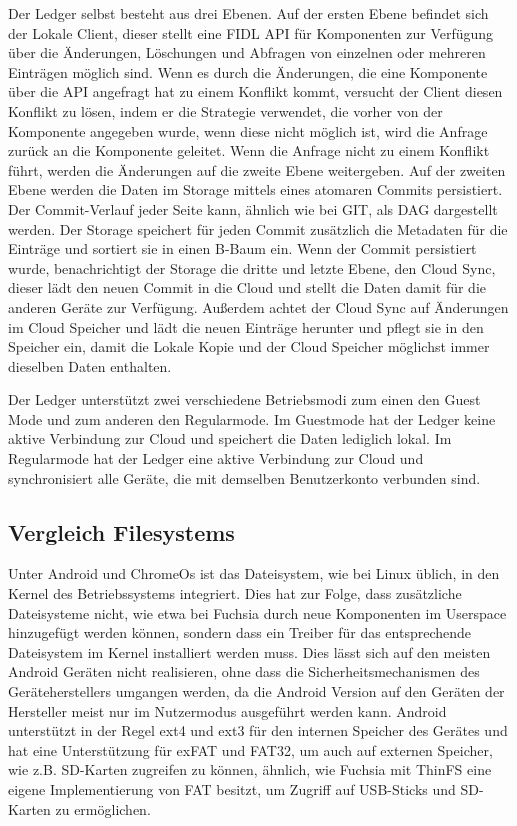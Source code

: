 \documentclass[a4paper]{scrartcl}
\begin{document}
Der Ledger selbst besteht aus drei Ebenen. Auf der ersten Ebene befindet sich der Lokale Client, dieser stellt eine FIDL API für Komponenten zur Verfügung über die Änderungen, Löschungen und Abfragen von einzelnen oder mehreren Einträgen möglich sind. Wenn es durch die Änderungen, die eine Komponente über die API angefragt hat zu einem Konflikt kommt, versucht der Client diesen Konflikt zu lösen, indem er die Strategie verwendet, die vorher von der Komponente angegeben wurde, wenn diese nicht möglich ist, wird die Anfrage zurück an die Komponente geleitet. Wenn die Anfrage nicht zu einem Konflikt führt, werden die Änderungen auf die zweite Ebene weitergeben. Auf der zweiten Ebene werden die Daten im Storage mittels eines atomaren Commits persistiert. Der Commit-Verlauf jeder Seite kann, ähnlich wie bei GIT, als DAG dargestellt werden. Der Storage speichert für jeden Commit zusätzlich die Metadaten für die Einträge und sortiert sie in einen B-Baum ein. Wenn der Commit persistiert wurde, benachrichtigt der Storage die dritte und letzte Ebene, den Cloud Sync, dieser lädt den neuen Commit in die Cloud und stellt die Daten damit für die anderen Geräte zur Verfügung. Außerdem achtet der Cloud Sync auf Änderungen im Cloud Speicher und lädt die neuen Einträge herunter und pflegt sie in den Speicher ein, damit die Lokale Kopie und der Cloud Speicher möglichst immer dieselben Daten enthalten. \cite{Fuchsia.Ledger}

Der Ledger unterstützt zwei verschiedene Betriebsmodi zum einen den Guest Mode und zum anderen den Regularmode. Im Guestmode hat der Ledger keine aktive Verbindung zur Cloud und speichert die Daten lediglich lokal. Im Regularmode hat der Ledger eine aktive Verbindung zur Cloud und synchronisiert alle Geräte, die mit demselben Benutzerkonto verbunden sind.
\subsection{Vergleich Filesystems}
\label{sec:vglFileSystems}
Unter Android und ChromeOs ist das Dateisystem, wie bei Linux üblich, in den Kernel des Betriebssystems integriert. Dies hat zur Folge, dass zusätzliche Dateisysteme nicht, wie etwa bei Fuchsia durch neue Komponenten im Userspace hinzugefügt werden können, sondern dass ein Treiber für das entsprechende Dateisystem im Kernel installiert werden muss. Dies lässt sich auf den meisten Android Geräten nicht realisieren, ohne dass die Sicherheitsmechanismen des Geräteherstellers umgangen werden, da die Android Version auf den Geräten der Hersteller meist nur im Nutzermodus ausgeführt werden kann. Android unterstützt in der Regel ext4 und ext3 für den internen Speicher des Gerätes und hat eine Unterstützung für exFAT und FAT32, um auch auf externen Speicher, wie z.B. SD-Karten zugreifen zu können, ähnlich, wie Fuchsia mit ThinFS eine eigene Implementierung von FAT besitzt, um Zugriff auf USB-Sticks und SD-Karten zu ermöglichen.
\end{document}
